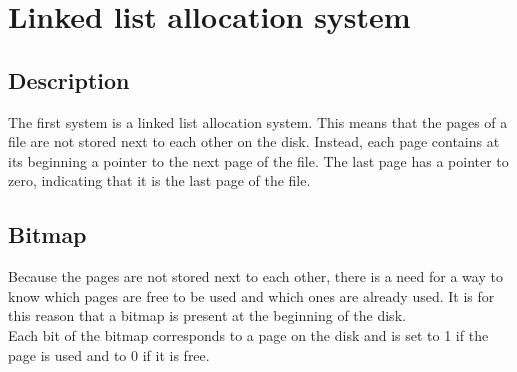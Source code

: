 \documentclass[10pt,a4paper]{ULBreport}
\begin{document}
\section{Linked list allocation system}
\label{sec:linkedlist}
\subsection{Description}
The first system is a linked list allocation system. This means that the pages of a file are not stored next to each other on the disk. Instead, each page contains at its beginning a pointer to the next page of the file. The last page has a pointer to zero, indicating that it is the last page of the file.
\subsection{Bitmap}
Because the pages are not stored next to each other, there is a need for a way to know which pages are free to be used and which ones are already used. It is for this reason that a bitmap is present at the beginning of the disk. \\
Each bit of the bitmap corresponds to a page on the disk and is set to 1 if the page is used and to 0 if it is free.
\end{document}
